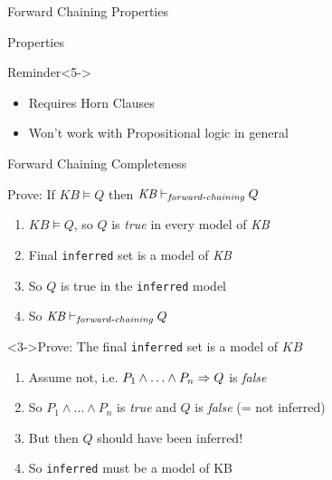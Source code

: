 \documentclass[14pt]{beamer}
\begin{document}
\begin{frame}{Forward Chaining Properties}
\begin{block}{Properties}
\begin{description}[Complete?]
\item[Sound?] 
\item[Complete?] 
\item[Time?] 
\end{description}
\end{block}
\begin{block}{Reminder}<5->
\begin{itemize}
\item Requires Horn Clauses
\item Won't work with Propositional logic in general
\end{itemize}
\end{block}
\end{frame}

\begin{frame}{Forward Chaining Completeness}
	\begin{block}{Prove: If $\textit{KB} \models Q$ then $\textit{KB} \vdash_{\textit{\scriptsize forward-chaining}} Q$}
		\begin{enumerate}
			\item<2-> $\textit{KB} \models Q$, so $Q$ is \emph{true} in every model of \emph{KB}
			\item<4-> Final \texttt{inferred} set is a model of \emph{KB}
			\item<4-> So $Q$ is true in the \texttt{inferred} model
			\item<4-> So $\textit{KB} \vdash_{\textit{\scriptsize forward-chaining}} Q$
		\end{enumerate}
	\end{block}
	\begin{block}<3->{Prove: The final \texttt{inferred} set is a model of $\textit{KB}$}
		\begin{enumerate}
			\item Assume not, i.e. $P_1 \land \ldots \land P_n \Rightarrow Q$ is \emph{false}
			\item So $P_1 \land \ldots \land P_n$ is \emph{true} and $Q$ is \emph{false} (= not inferred)
			\item But then $Q$ should have been inferred!
			\item So \texttt{inferred} must be a model of KB
		\end{enumerate}
	\end{block}
\end{frame}
\end{document}
